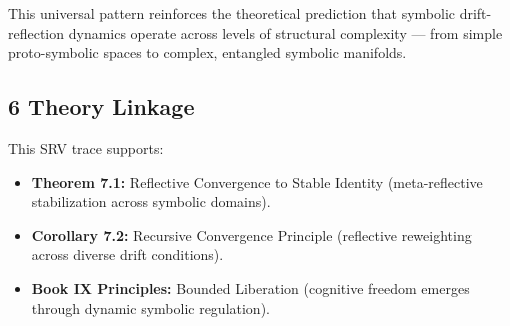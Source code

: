 This universal pattern reinforces the theoretical prediction that symbolic drift-reflection dynamics operate across levels of structural complexity — from simple proto-symbolic spaces to complex, entangled symbolic manifolds.

\subsection*{6 Theory Linkage}
\label{subsection:trace5_theory_linkage}

This SRV trace supports:
\begin{itemize}
    \item \textbf{Theorem 7.1:} Reflective Convergence to Stable Identity (meta-reflective stabilization across symbolic domains).
    \item \textbf{Corollary 7.2:} Recursive Convergence Principle (reflective reweighting across diverse drift conditions).
    \item \textbf{Book IX Principles:} Bounded Liberation (cognitive freedom emerges through dynamic symbolic regulation).
\end{itemize}
